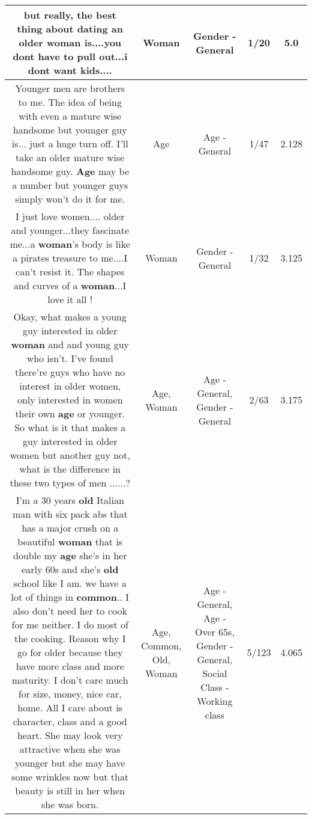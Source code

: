 \documentclass[11pt]{article}
\newlength\mylength
\begin{document}
\begin{center}
\begin{longtable}{|C{.65\mylength}|C{.30\mylength}|C{.12\mylength}|C{.12\mylength}|C{.12\mylength}|}
  \small but really, the best thing about dating an older \textbf{woman} is....you dont have to pull out...i dont want kids....\normalsize   & Woman & Gender - General & 1/20 & 5.0 \\  \hline
  \small Younger men are brothers to me. The idea of being with even a mature wise handsome but younger guy is... just a huge turn off. I'll take an older mature wise handsome guy. \textbf{Age} may be a number but younger guys simply won't do it for me.\normalsize   & Age & Age - General & 1/47 & 2.128 \\  \hline
  \small I just love women.... older and younger...they fascinate me...a \textbf{woman}'s body is like a pirates treasure to me....I can't resist it. The shapes and curves of a \textbf{woman}...I love it all !\normalsize   & Woman & Gender - General & 1/32 & 3.125 \\  \hline
  \small Okay, what makes a young guy interested in older \textbf{woman} and and young guy who isn't.    I've found there're guys who have no interest in older women, only interested in women their own \textbf{age} or younger.  So what is it that makes a guy interested in older women but another guy not, what is the difference in these two types of men ......?\normalsize   & Age, Woman & Age - General, Gender - General & 2/63 & 3.175 \\  \hline
  \small I'm a 30 years \textbf{old} Italian man with six pack abs that has a major crush on a beautiful \textbf{woman} that is double my \textbf{age} she's in her early 60s and she's \textbf{old} school like I am. we have a lot of things in \textbf{common}.. I also don't need her to cook for me neither. I do most of the cooking. Reason why I go for older because they have more class and more maturity. I don't care much for size, money, nice car, home. All I care about is character, class and a good heart. She may look very attractive when she was younger but she may have some wrinkles now but that beauty is still in her when she was born.\normalsize   & Age, Common, Old, Woman & Age - General, Age - Over 65s, Gender - General, Social Class - Working class & 5/123 & 4.065 \\  \hline

\end{longtable}
\end{center}
\end{document}
